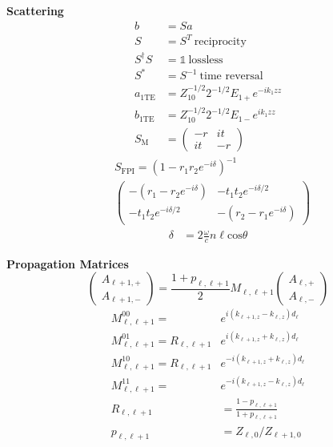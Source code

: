 \documentclass[12pt]{article}
\begin{document}
\begin{multicols}{3}
\textbf{Scattering}
\begin{align}
  b &= Sa\\
  S &= S^T \ \textrm{reciprocity}\\
  S^{\dagger} S &= \mathbb{1} \ \textrm{lossless}\\
  S^{*} &= S^{-1} \ \textrm{time reversal}\\
  a_{1 \textrm{TE}} &= Z_{10}^{-1/2}2^{-1/2}E_{1+}e^{-ik_1z z}\\
  b_{1 \textrm{TE}} &= Z_{10}^{-1/2}2^{-1/2}E_{1-}e^{ik_1z z}\\
  S_{\textrm{M}} &=
  \begin{pmatrix}
    -r & it\\
    it & -r
  \end{pmatrix}
\end{align}
\begin{equation}
  \begin{split}
    &S_{\textrm{FPI}} = (1- r_1r_2e^{-i \delta})^{-1}\\
    &\begin{pmatrix}
       -(r_1 - r_2e^{-i \delta}) & -t_1t_2e^{-i\delta/2}\\
       -t_1t_2e^{-i\delta/2} & -(r_2-r_1e^{-i\delta})
     \end{pmatrix}
  \end{split}
\end{equation}
\vspace{-2em}
\begin{align}
  \delta &= 2 \frac{\omega}{c} n \ell \textrm{cos}\theta
\end{align}

\textbf{Propagation Matrices}
\begin{equation}
  \begin{pmatrix}A_{\ell + 1,+}\\A_{\ell + 1, -}\end{pmatrix} =
  \textstyle{\frac{1 + p_{\ell, \ell + 1}}{2}} M_{\ell, \ell + 1}
  \begin{pmatrix}
    A_{\ell, +}\\
    A_{\ell, -}
  \end{pmatrix}
\end{equation}
\begin{align}
  M_{\ell, \ell + 1}^{00} = &e^{i(k_{\ell + 1, z} - k_{\ell ,z})d_\ell}\\
  M_{\ell, \ell + 1}^{01} = R_{\ell, \ell + 1} &e^{i(k_{\ell + 1, z} + k_{\ell, z})d_\ell}\\
  M_{\ell, \ell + 1}^{10} = R_{\ell, \ell + 1} &e^{-i(k_{\ell + 1, z} + k_{\ell, z})d_\ell}\\
  M_{\ell, \ell + 1}^{11} = &e^{-i(k_{\ell + 1, z} - k_{\ell, z})d_\ell}\\
  R_{\ell, \ell + 1} &= \frac{1 - p_{\ell, \ell + 1}}{1 + p_{\ell, \ell + 1}}\\
  p_{\ell, \ell + 1} &= Z_{\ell, 0} / Z_{\ell + 1, 0}
\end{align}


\end{multicols}
\end{document}
